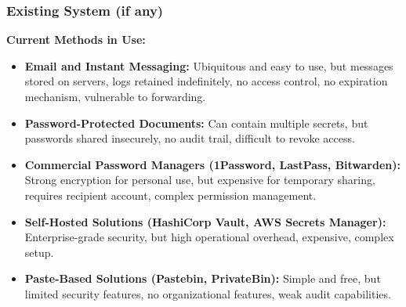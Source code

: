 \documentclass[12pt,a4paper]{article}
\begin{document}
\subsubsection{Existing System (if any)}

\textbf{Current Methods in Use:}
\begin{itemize}[leftmargin=*]
  \item \textbf{Email and Instant Messaging:} Ubiquitous and easy to use, but messages stored on servers, logs retained indefinitely, no access control, no expiration mechanism, vulnerable to forwarding.
  \item \textbf{Password-Protected Documents:} Can contain multiple secrets, but passwords shared insecurely, no audit trail, difficult to revoke access.
  \item \textbf{Commercial Password Managers (1Password, LastPass, Bitwarden):} Strong encryption for personal use, but expensive for temporary sharing, requires recipient account, complex permission management.
  \item \textbf{Self-Hosted Solutions (HashiCorp Vault, AWS Secrets Manager):} Enterprise-grade security, but high operational overhead, expensive, complex setup.
  \item \textbf{Paste-Based Solutions (Pastebin, PrivateBin):} Simple and free, but limited security features, no organizational features, weak audit capabilities.
\end{itemize}
\end{document}
